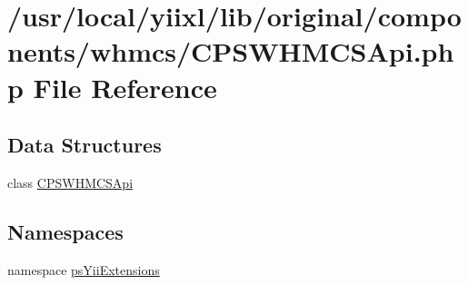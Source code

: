 \hypertarget{CPSWHMCSApi_8php}{
\section{/usr/local/yiixl/lib/original/components/whmcs/CPSWHMCSApi.php File Reference}
\label{CPSWHMCSApi_8php}
}
\subsection*{Data Structures}
\begin{DoxyCompactItemize}
\item 
class \hyperlink{classCPSWHMCSApi}{CPSWHMCSApi}
\end{DoxyCompactItemize}
\subsection*{Namespaces}
\begin{DoxyCompactItemize}
\item 
namespace \hyperlink{namespacepsYiiExtensions}{psYiiExtensions}
\end{DoxyCompactItemize}
